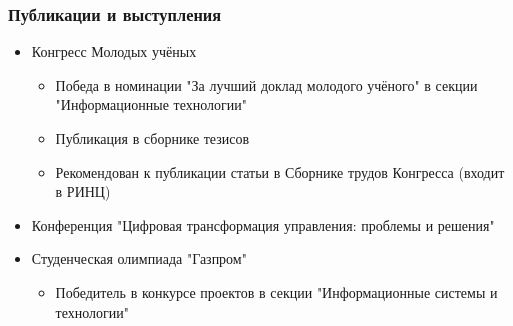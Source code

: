 \documentclass[t, 12pt]{beamer}
\theoremstyle{definition}
\begin{document}
\begin{frame}
\frametitle{Публикации и выступления}
\begin{itemize}
	\item Конгресс Молодых учёных 
        \begin{itemize}
            \item Победа в номинации "За лучший доклад молодого учёного" в секции "Информационные технологии"
            \item Публикация в сборнике тезисов
            \item Рекомендован к публикации статьи в Сборнике трудов Конгресса (входит в РИНЦ)
        \end{itemize}
	\item Конференция "Цифровая трансформация управления: проблемы и решения" 
    \item Студенческая олимпиада "Газпром"
        \begin{itemize} \item Победитель в конкурсе проектов в секции "Информационные системы и технологии"\end{itemize}
\end{itemize}
\end{frame}
\end{document}
